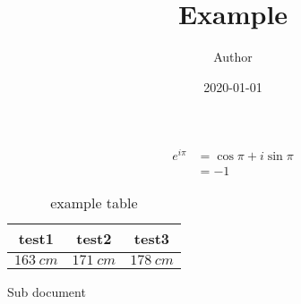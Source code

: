 \documentclass[a4paper,11pt,xelatex,ja=standard]{bxjsarticle}
\title{Example}
\author{Author}
\date{2020-01-01}
\begin{document}
\maketitle
\begin{align}
e^{i\pi} &= \cos{\pi} + i\sin{\pi}\\
&=-1
\end{align}

\begin{table}[hbtp]
\centering
\caption{example table}
\begin{tabular}{ccc}
\hline
test1 & test2 & test3 \\
\hline \hline
$\SI{163}{cm}$ & $\SI{171}{cm}$ & $\SI{178}{cm}$ \\
\hline
\end{tabular}
\end{table}

\textrm{Sub document}
\end{document}
